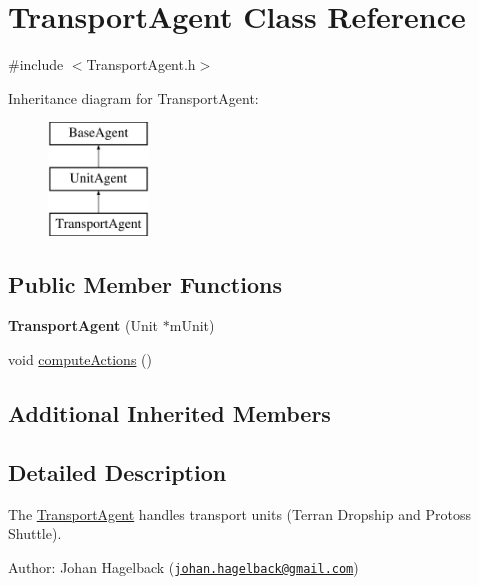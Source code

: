 \hypertarget{class_transport_agent}{\section{Transport\-Agent Class Reference}
\label{class_transport_agent}
}


{\ttfamily \#include $<$Transport\-Agent.\-h$>$}

Inheritance diagram for Transport\-Agent\-:\begin{figure}[H]
\begin{center}
\leavevmode
\includegraphics[height=3.000000cm]{class_transport_agent}
\end{center}
\end{figure}
\subsection*{Public Member Functions}
\begin{DoxyCompactItemize}
\item 
\hypertarget{class_transport_agent_aed762e48af27824c4bedd72a538e92c8}{{\bfseries Transport\-Agent} (Unit $\ast$m\-Unit)}\label{class_transport_agent_aed762e48af27824c4bedd72a538e92c8}

\item 
void \hyperlink{class_transport_agent_a36e0a537419178fde4713c476951c06a}{compute\-Actions} ()
\end{DoxyCompactItemize}
\subsection*{Additional Inherited Members}


\subsection{Detailed Description}
The \hyperlink{class_transport_agent}{Transport\-Agent} handles transport units (Terran Dropship and Protoss Shuttle).

Author\-: Johan Hagelback (\href{mailto:johan.hagelback@gmail.com}{\tt johan.\-hagelback@gmail.\-com}) 

